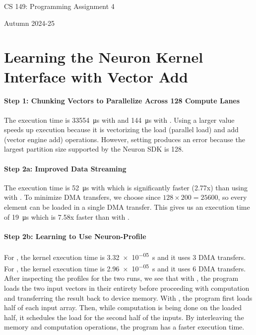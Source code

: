 \documentclass[11pt]{article}
\begin{document}
\lstset{language=C++,basicstyle=\footnotesize\ttfamily,breaklines=true}

\fancyhf{}
\setlength{\headheight}{14pt}
\pagestyle{fancy}

\centerline{\Large CS 149: Programming Assignment 4}
\centerline{Autumn 2024-25}

\section{Learning the Neuron Kernel Interface with Vector Add}

\paragraph{Step 1: Chunking Vectors to Parallelize Across 128 Compute Lanes}

The execution time is \SI{33554}{\micro\second} with  and
\SI{144}{\micro\second} with . Using a larger
 value speeds up execution because it is vectorizing the load
(parallel load) and add (vector engine add) operations. However, setting
 produces an error because the largest partition size
supported by the Neuron SDK is 128.

\paragraph{Step 2a: Improved Data Streaming}

The execution time is \SI{52}{\micro\second} with  which is
significantly faster (2.77x) than using  with
. To minimize DMA transfers, we choose 
since $128 \times 200 = 25600$, so every element can be loaded in a single DMA
transfer. This gives us an execution time of \SI{19}{\micro\second} which is
7.58x faster than  with .

\paragraph{Step 2b: Learning to Use Neuron-Profile}

For , the kernel execution time is \SI{3.32e-05}{\second}
and it uses 3 DMA transfers. For , the kernel execution time
is \SI{2.96e-05}{\second} and it uses 6 DMA transfers. After inspecting the
profiles for the two runs, we see that with , the program
loads the two input vectors in their entirety before proceeding with
computation and transferring the result back to device memory. With
, the program first loads half of each input array. Then,
while computation is being done on the loaded half, it schedules the load for
the second half of the inputs. By interleaving the memory and computation
operations, the program  has a faster execution time.
\end{document}
